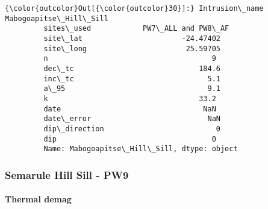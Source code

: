 \documentclass{article}
\begin{document}
            \begin{Verbatim}[commandchars=\\\{\}]
{\color{outcolor}Out[{\color{outcolor}30}]:} Intrusion\_name    Mabogoapitse\_Hill\_Sill
         sites\_used            PW7\_ALL and PW8\_AF
         site\_lat                       -24.47402
         site\_long                       25.59705
         n                                      9
         dec\_tc                             184.6
         inc\_tc                               5.1
         a\_95                                 9.1
         k                                   33.2
         date                                 NaN
         date\_error                           NaN
         dip\_direction                          0
         dip                                    0
         Name: Mabogoapitse\_Hill\_Sill, dtype: object
\end{Verbatim}
        
    \subsubsection{Semarule Hill Sill - PW9}\label{semarule-hill-sill---pw9}

    \paragraph{Thermal demag}\label{thermal-demag}
\end{document}
